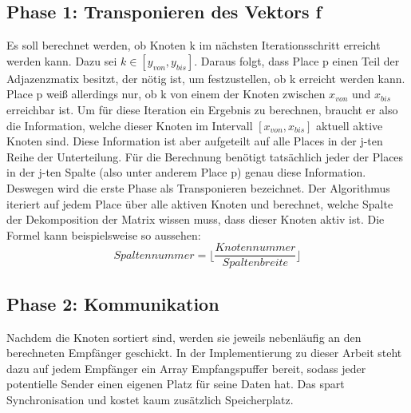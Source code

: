 \subsection{Phase 1: Transponieren des Vektors f} %
\label{sub:transponieren_des_vektors_f}
Es soll berechnet werden, ob Knoten k im nächsten Iterationsschritt erreicht werden kann. Dazu sei $k \in \left[y_{von}, y_{bis} \right]$. Daraus folgt, dass Place p einen Teil der Adjazenzmatix besitzt, der nötig ist, um festzustellen, ob k erreicht werden kann. Place p weiß allerdings nur, ob k von einem der Knoten zwischen $x_{von}$ und $x_{bis}$ erreichbar ist. Um für diese Iteration ein Ergebnis zu berechnen, braucht er also die Information, welche dieser Knoten im Intervall $\left[x_{von}, x_{bis} \right]$ aktuell aktive Knoten sind. Diese Information ist aber aufgeteilt auf alle Places in der j-ten Reihe der Unterteilung. Für die Berechnung benötigt tatsächlich jeder der Places in der j-ten Spalte (also unter anderem Place p) genau diese Information. Deswegen wird die erste Phase als Transponieren bezeichnet. Der Algorithmus iteriert auf jedem Place über alle aktiven Knoten und berechnet, welche Spalte der Dekomposition der Matrix wissen muss, dass dieser Knoten aktiv ist. Die Formel kann beispielsweise so aussehen: $$\mathit{Spaltennummer}= \lfloor\frac{\mathit{Knotennummer}}{\mathit{Spaltenbreite}}\rfloor$$

\subsection{Phase 2: Kommunikation} %
\label{ssub:kommunikation}
Nachdem die Knoten sortiert sind, werden sie jeweils nebenläufig an den berechneten Empfänger geschickt. In der Implementierung zu dieser Arbeit steht dazu auf jedem Empfänger ein Array Empfangspuffer bereit, sodass jeder potentielle Sender einen eigenen Platz für seine Daten hat. Das spart Synchronisation und kostet kaum zusätzlich Speicherplatz.

